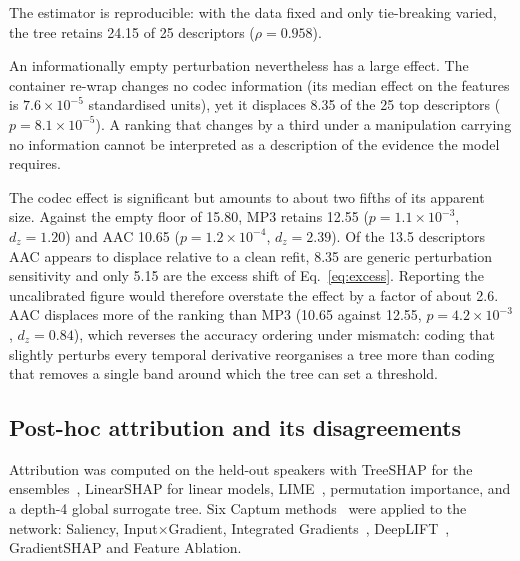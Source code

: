 \documentclass[lettersize,journal]{IEEEtran}
\begin{document}
The estimator is reproducible: with the data fixed and only tie-breaking
varied, the tree retains 24.15 of 25 descriptors ($\rho=0.958$).

An informationally empty perturbation nevertheless has a large effect. The
container re-wrap changes no codec information (its median effect on the
features is $7.6\times10^{-5}$ standardised units), yet it displaces 8.35 of the
25 top descriptors ($p=8.1\times10^{-5}$). A ranking that changes by a third
under a manipulation carrying no information cannot be interpreted as a
description of the evidence the model requires.

The codec effect is significant but amounts to about two fifths of its apparent
size. Against the empty floor of 15.80, MP3 retains 12.55 ($p=1.1\times10^{-3}$,
$d_z=1.20$) and AAC 10.65 ($p=1.2\times10^{-4}$, $d_z=2.39$). Of the 13.5
descriptors AAC appears to displace relative to a clean refit, 8.35 are generic
perturbation sensitivity and only 5.15 are the excess shift of
Eq.~\eqref{eq:excess}. Reporting the uncalibrated figure would therefore
overstate the effect by a factor of about 2.6. AAC displaces more of the ranking
than MP3 (10.65 against 12.55, $p=4.2\times10^{-3}$, $d_z=0.84$), which reverses
the accuracy ordering under mismatch: coding that slightly perturbs every
temporal derivative reorganises a tree more than coding that removes a single
band around which the tree can set a threshold.

\subsection{Post-hoc attribution and its disagreements}\label{sec:posthoc}
Attribution was computed on the held-out speakers with TreeSHAP for the
ensembles~\cite{lundberg2020treeshap}, LinearSHAP for linear models,
LIME~\cite{ribeiro2016lime}, permutation importance, and a depth-4 global
surrogate tree. Six Captum methods~\cite{kokhlikyan2020captum} were applied to
the network: Saliency, Input$\times$Gradient,
Integrated Gradients~\cite{sundararajan2017ig},
DeepLIFT~\cite{shrikumar2017deeplift}, GradientSHAP and Feature Ablation.
\end{document}
